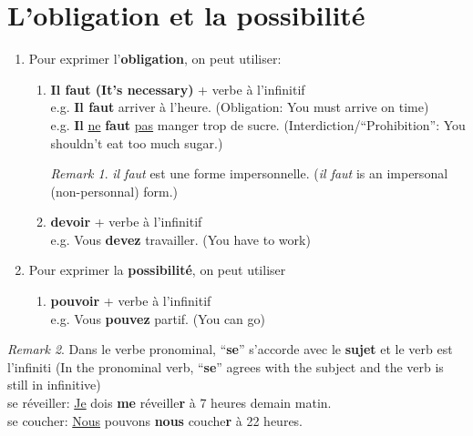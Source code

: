 \documentclass[math,code]{amznotes}
\theoremstyle{remark}
\newtheorem*{remark}{Remark}
\begin{document}
\section{L'obligation et la possibilité}
\begin{enumerate}
    \item Pour exprimer l'\textbf{obligation}, on peut utiliser:
    \begin{enumerate}
        \item \textbf{Il faut (It's necessary)} + verbe à l'infinitif \\
        e.g. \textbf{Il faut} arriver à l'heure. (Obligation: You must arrive on time) \\
        e.g. \textbf{Il} \underline{ne} \textbf{faut} \underline{pas} manger trop de sucre. (Interdiction/``Prohibition'': You shouldn't eat too much sugar.)
        \begin{notebox}
            \begin{remark}
                \textit{il faut} est une forme impersonnelle. (\textit{il faut} is an impersonal (non-personnal) form.)
            \end{remark}
        \end{notebox}
        \item \textbf{devoir} + verbe à l'infinitif \\
        e.g. Vous \textbf{devez} travailler. (You have to work)
    \end{enumerate}
    \item Pour exprimer la \textbf{possibilité}, on peut utiliser
    \begin{enumerate}
        \item \textbf{pouvoir} + verbe à l'infinitif \\
        e.g. Vous \textbf{pouvez} partif. (You can go)
    \end{enumerate}
\end{enumerate}
\begin{notebox}
    \begin{remark}
        Dans le verbe pronominal, ``\textbf{se}'' s'accorde avec le \textbf{sujet} et le verb est l'infiniti (In the pronominal verb, ``\textbf{se}'' agrees with the subject and the verb is still in infinitive) \\
        se réveiller: \underline{Je} dois \textbf{me} réveille\textbf{r} à 7 heures demain matin. \\
        se coucher: \underline{Nous} pouvons \textbf{nous} couche\textbf{r} à 22 heures.
    \end{remark}
\end{notebox}
\end{document}
